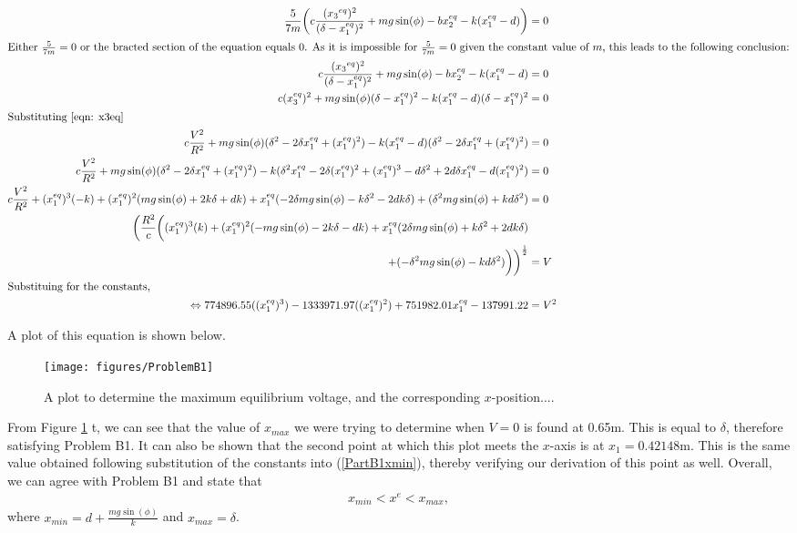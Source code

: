 \documentclass[a4paper,10pt,reqno]{amsart}
\numberwithin{equation}{section}
\begin{document}
\begin{align}
\frac{5}{7m}\bigg(c \frac{({x_3}^{eq})^2}{(\delta - x_1^{eq})^2} + mg\sin(\phi) - bx_2^{eq} - k(x_1^{eq}-d)\bigg) &= 0 \nonumber \\
\intertext{Either $\frac{5}{7m} = 0$ or the bracted section of the equation equals 0. As it is impossible for $\frac{5}{7m} = 0$ given the constant value of $m$, this leads to the following conclusion:}
c \frac{({x_3}^{eq})^2}{(\delta - x_1^{eq})^2} + mg\sin(\phi) - bx_2^{eq} - k(x_1^{eq}-d) &= 0 \nonumber \\
c(x_3^{eq})^2 + mg\sin(\phi)(\delta - x_1^{eq})^2 - k(x_1^{eq} - d)(\delta - x_1^{eq})^2 &= 0 \nonumber \\
\intertext{Substituting \ref{eqn: x3eq}}
c\frac{V^2}{R^2} + mg\sin(\phi)(\delta^2 - 2 \delta x_1^{eq} + (x_1^{eq})^2) - k(x_1^{eq} - d)(\delta^2 - 2 \delta x_1^{eq} + (x_1^{eq})^2) &= 0 \nonumber \\
c\frac{V^2}{R^2} + mg\sin(\phi)(\delta^2 - 2 \delta x_1^{eq} + (x_1^{eq})^2) - k(\delta^2 x_1^{eq} - 2\delta (x_1^{eq})^2 + (x_1^{eq})^3 -d\delta^2 + 2d\delta x_1^{eq} - d(x_1^{eq})^2) &= 0 \nonumber \\
c\frac{V^2}{R^2} + (x_1^{eq})^3(-k) + (x_1^{eq})^2(mg\sin(\phi) + 2k\delta +dk) + x_1^{eq}(-2\delta mg\sin(\phi) - k\delta^2 -2dk\delta) + (\delta^2mg\sin(\phi) + kd\delta^2) &= 0 \nonumber \\
\bigg(\frac{R^2}{c}\bigg((x_1^{eq})^3(k) + (x_1^{eq})^2(-mg\sin(\phi) - 2k\delta -dk) + x_1^{eq}(2\delta mg\sin(\phi) + k\delta^2 +2dk\delta) \nonumber \\  + (-\delta^2mg\sin(\phi) - kd\delta^2)\bigg)\bigg)^\frac{1}{2} &= V \nonumber \\
\intertext{Substituing for the constants,}
\Leftrightarrow 774896.55((x_1^{eq})^3) - 1333971.97((x_1^{eq})^2) + 751982.01x_1^{eq} - 137991.22 &= V^2 \label{eqn: B1deriv}
\end{align}

A plot of this equation is shown below.
\begin{figure}[h]
\centering
\texttt{[image: figures/ProblemB1]}
\caption{A plot to determine the maximum equilibrium voltage, and the corresponding $x$-position....}
\label{fig:B1plot}
\end{figure}

From Figure \ref{fig:B1plot} t, we can see that the value of $x_{max}$ we were trying to determine when $V = 0$ is found at 0.65m. This is equal to $\delta$, therefore satisfying Problem B1. It can also be shown that the second point at which this plot meets the $x$-axis is at $x_1 = 0.42148$m. This is the same value obtained following substitution of the constants into (\ref{PartB1xmin}), thereby verifying our derivation of this point as well.
Overall, we can agree with Problem B1 and state that
\begin{align}
x_{min} < x^e < x_{max},
\end{align}
where $x_{min} = d + \frac{mg\sin(\phi)}{k}$ and $x_{max} = \delta$.
\end{document}
